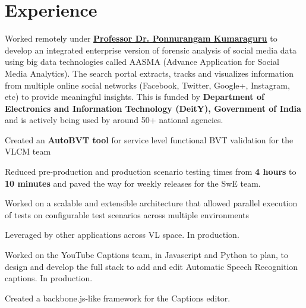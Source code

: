 \documentclass[]{deedy-resume-openfont}
\begin{document}
\hfill
\begin{minipage}[t]{0.66\textwidth} 


\section{Experience}
\vspace{\topsep}
Worked remotely under \textbf{\href{http://precog.iiitd.edu.in/people/pk/Home.html}{Professor Dr. Ponnurangam Kumaraguru}} to develop an integrated enterprise version of forensic analysis of social media data using big data technologies called AASMA (Advance Application for Social Media Analytics). The search portal extracts, tracks and visualizes information from multiple online social networks (Facebook, Twitter, Google+, Instagram, etc) to provide meaningful insights. This is funded by \textbf{Department of Electronics and Information Technology (DeitY), Government of India} and is actively being used by around 50+ national agencies.
\sectionsep

\vspace{\topsep} %
\begin{tightemize}
\item Created an \textbf{AutoBVT tool} for service level functional BVT validation for the VLCM team
\item Reduced pre-production and production scenario testing times from \textbf{4 hours} to \textbf{10 minutes} and paved the way for weekly releases for the SwE team.
\item
Worked on a scalable and extensible architecture that allowed parallel execution of tests on configurable test scenarios across multiple environments
\item Leveraged by other applications across VL space. In production.
\end{tightemize}
\sectionsep

\begin{tightemize}
\item Worked on the YouTube Captions team, in Javascript and Python to plan, to design and develop the full stack to add and edit Automatic Speech Recognition captions. In production.
\item Created a backbone.js-like framework for the Captions editor.
\end{tightemize}
\sectionsep


\end{minipage}
\end{document}
